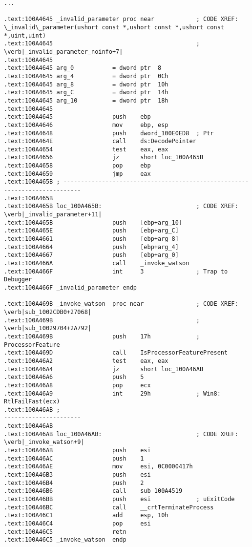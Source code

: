 \begin{lstlisting}[style=customasmx86]
...

.text:100A4645 _invalid_parameter proc near            ; CODE XREF: \_invalid\_parameter(ushort const *,ushort const *,ushort const *,uint,uint)
.text:100A4645                                         ; \verb|_invalid_parameter_noinfo+7|
.text:100A4645
.text:100A4645 arg_0           = dword ptr  8
.text:100A4645 arg_4           = dword ptr  0Ch
.text:100A4645 arg_8           = dword ptr  10h
.text:100A4645 arg_C           = dword ptr  14h
.text:100A4645 arg_10          = dword ptr  18h
.text:100A4645
.text:100A4645                 push    ebp
.text:100A4646                 mov     ebp, esp
.text:100A4648                 push    dword_100E0ED8  ; Ptr
.text:100A464E                 call    ds:DecodePointer
.text:100A4654                 test    eax, eax
.text:100A4656                 jz      short loc_100A465B
.text:100A4658                 pop     ebp
.text:100A4659                 jmp     eax
.text:100A465B ; ---------------------------------------------------------------------------
.text:100A465B
.text:100A465B loc_100A465B:                           ; CODE XREF: \verb|_invalid_parameter+11|
.text:100A465B                 push    [ebp+arg_10]
.text:100A465E                 push    [ebp+arg_C]
.text:100A4661                 push    [ebp+arg_8]
.text:100A4664                 push    [ebp+arg_4]
.text:100A4667                 push    [ebp+arg_0]
.text:100A466A                 call    _invoke_watson
.text:100A466F                 int     3               ; Trap to Debugger
.text:100A466F _invalid_parameter endp

.text:100A469B _invoke_watson  proc near               ; CODE XREF: \verb|sub_1002CDB0+27068|
.text:100A469B                                         ; \verb|sub_10029704+2A792|
.text:100A469B                 push    17h             ; ProcessorFeature
.text:100A469D                 call    IsProcessorFeaturePresent
.text:100A46A2                 test    eax, eax
.text:100A46A4                 jz      short loc_100A46AB
.text:100A46A6                 push    5
.text:100A46A8                 pop     ecx
.text:100A46A9                 int     29h             ; Win8: RtlFailFast(ecx)
.text:100A46AB ; ---------------------------------------------------------------------------
.text:100A46AB
.text:100A46AB loc_100A46AB:                           ; CODE XREF: \verb|_invoke_watson+9|
.text:100A46AB                 push    esi
.text:100A46AC                 push    1
.text:100A46AE                 mov     esi, 0C0000417h
.text:100A46B3                 push    esi
.text:100A46B4                 push    2
.text:100A46B6                 call    sub_100A4519
.text:100A46BB                 push    esi             ; uExitCode
.text:100A46BC                 call    __crtTerminateProcess
.text:100A46C1                 add     esp, 10h
.text:100A46C4                 pop     esi
.text:100A46C5                 retn
.text:100A46C5 _invoke_watson  endp
\end{lstlisting}

